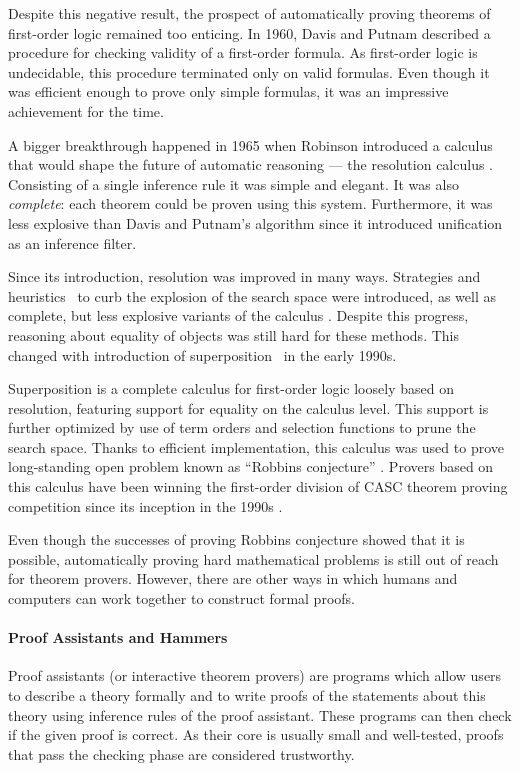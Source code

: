 Despite this negative result, the prospect of automatically proving theorems of
first-order logic remained too enticing. In 1960, Davis and Putnam
\cite{dp-1960-dpll} described a procedure for checking validity of a
first-order formula. As first-order logic is undecidable, this procedure
terminated only on valid formulas. Even though it was efficient enough to prove
only simple formulas, it was an impressive achievement for the time.

A bigger breakthrough happened in 1965 when Robinson introduced a calculus that
would shape the future of automatic reasoning --- the resolution calculus
\cite{ar-65-resolution}. Consisting of a single inference rule it was simple and
elegant. It was also \emph{complete}: each theorem could be proven using this
system. Furthermore, it was less explosive than Davis and Putnam's algorithm
since it introduced unification as an inference filter.

Since its introduction, resolution was improved in many ways. Strategies and
heuristics~\cite{lw-65-sos} to curb the explosion of the search space were
introduced, as well as complete, but less explosive variants of the calculus
\cite{cc-73-resolution-book}. Despite this progress, reasoning about equality of
objects was still hard for these methods. This changed with introduction of
superposition~\cite{bg-94-superposition} in the early 1990s.

Superposition is a complete calculus for first-order logic loosely based on
resolution, featuring support for equality on the calculus level. This support
is further optimized by use of term orders and selection functions to prune the
search space. Thanks to efficient implementation, this calculus was used to
prove long-standing open problem known as ``Robbins conjecture''
\cite{mccune-97-robbins}. Provers based on this calculus have been
winning the first-order division of CASC theorem proving competition since its
inception in the 1990s \cite{ss-96-casc}.

Even though the successes of proving Robbins conjecture showed that it is
possible, automatically proving hard mathematical problems is still out of reach
for theorem provers. However, there are other ways in which humans and computers can work together to construct formal
proofs.

\paragraph{Proof Assistants and Hammers} Proof assistants (or interactive
theorem provers) are programs which allow users to describe a theory formally
and to write proofs of the statements about this theory using inference 
rules of the proof assistant. These programs can then check if the given proof
is correct. As their core is usually small and well-tested, proofs that pass the
checking phase are considered trustworthy.

